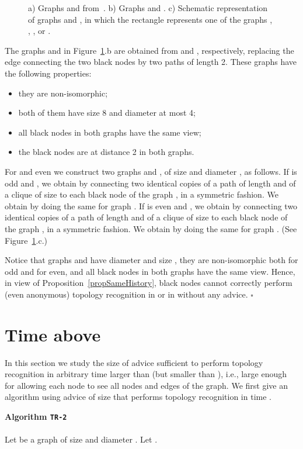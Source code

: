 \documentclass{article}
\newcommand*{\qed}{\hfill\ensuremath{\square}}
\newenvironment{proof}{\noindent{\bf Proof:}}{\qed}
\newcommand{\algo}[1]{
\medskip
\noindent \textbf{Algorithm {\tt #1}}\\
\nopagebreak}
\begin{document}
\begin{proof}
\begin{figure}
\caption{\label{fig.yk} a) Graphs  and  from~\cite{YK3}. b) Graphs  and . c) Schematic representation of graphs  and , in which the rectangle represents one of the graphs , , , or .  }
\end{figure}


The graphs  and  in Figure~\ref{fig.yk}.b are obtained from   and , respectively, replacing the edge connecting the two black nodes by two paths of length 2.
These graphs have the following properties:
\begin{itemize}
\item they are non-isomorphic;
\item both of them have size 8 and diameter at most 4;
\item all black nodes in both graphs have the same view;
\item the black nodes are at distance 2 in both graphs.
\end{itemize}
For  and even  we construct two graphs  and , of size  and diameter , as follows.
If  is odd and , we obtain  by  connecting two identical copies of a path of length  and of a clique of size  to each black node of the graph , in a symmetric fashion.
We obtain  by doing the same for graph .
If  is even and , we obtain  by  connecting two identical copies of a path of length  and of a clique of size  to each black node of the graph , in a symmetric fashion.
We obtain  by doing the same for graph . (See Figure~\ref{fig.yk}.c.)

Notice that graphs  and  have diameter  and size , they are non-isomorphic both for  odd and for  even, and all black nodes in both graphs have the same view. Hence, in view of Proposition~\ref{propSameHistory}, black nodes cannot correctly perform (even anonymous) topology recognition in  or in  without any advice. 
\end{proof}






\section{Time above }
In this section we study the size of advice sufficient to perform topology recognition in arbitrary time larger than  (but smaller than ), i.e., large enough for allowing each node to see all nodes and edges of the graph.
We first give an algorithm using advice of size  that performs topology recognition in time .

\algo{TR-2}
\\
Let  be a graph of size  and diameter . Let .
\end{document}
